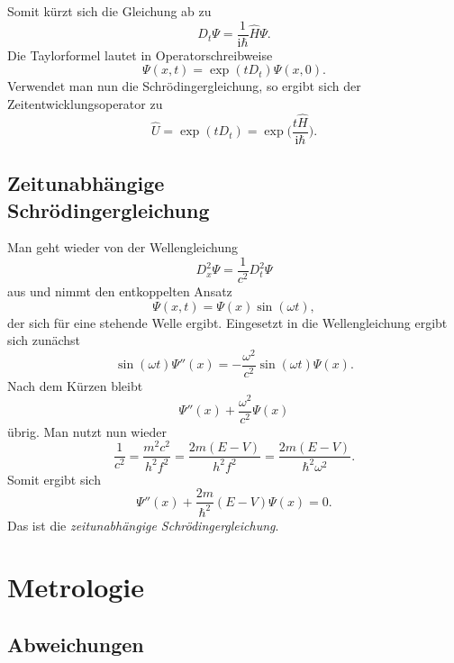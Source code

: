 \documentclass[a4paper,10pt,fleqn,twocolumn,twoside]{scrartcl}
\numberwithin{equation}{section}
\newcommand{\ui}{\mathrm i}
\begin{document}
Somit kürzt sich die Gleichung ab zu
\begin{equation}
D_t\Psi = \frac{1}{\ui\hbar}\hat H\Psi.
\end{equation}
Die Taylorformel lautet in Operatorschreibweise
\begin{equation}
\Psi(x,t)=\exp(tD_t)\Psi(x,0).
\end{equation}
Verwendet man nun die Schrödingergleichung, so ergibt sich
der Zeitentwicklungsoperator zu
\begin{equation}
\hat U = \exp(tD_t) = \exp\Big(\frac{t\hat H}{\ui\hbar}\Big).
\end{equation}

\subsection[Zeitunabhängige Schrödingergleichung]
{Zeitunabhängige\\
Schrödingergleichung}

Man geht wieder von der Wellengleichung
\begin{equation}
D_x^2\Psi=\frac{1}{c^2}D_t^2\Psi
\end{equation}
aus und nimmt den entkoppelten Ansatz
\begin{equation}
\Psi(x,t)=\Psi(x)\sin(\omega t),
\end{equation}
der sich für eine stehende Welle ergibt. Eingesetzt in
die Wellengleichung ergibt sich zunächst
\begin{equation}
\sin(\omega t)\Psi''(x)=-\frac{\omega^2}{c^2}\sin(\omega t)\Psi(x).
\end{equation}
Nach dem Kürzen bleibt
\begin{equation}
\Psi''(x) + \frac{\omega^2}{c^2}\Psi(x)
\end{equation}
übrig. Man nutzt nun wieder
\begin{equation}
\frac{1}{c^2} = \frac{m^2 c^2}{h^2 f^2}
= \frac{2m(E-V)}{h^2 f^2}
= \frac{2m(E-V)}{\hbar^2 \omega^2}.
\end{equation}
Somit ergibt sich
\begin{equation}
\Psi''(x) + \frac{2m}{\hbar^2}(E-V)\Psi(x) = 0.
\end{equation}
Das ist die \emph{zeitunabhängige Schrödingergleichung}.

\newpage
\section{Metrologie}
\subsection{Abweichungen}
\end{document}
